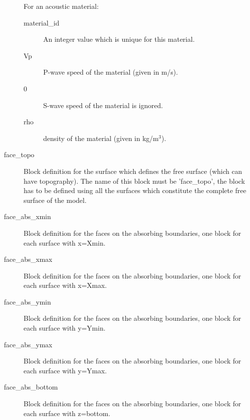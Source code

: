 \begin{description}
For an acoustic material:
\begin{description}
\item [{material\_id}] An integer value which is unique for this material.
\item [{Vp}] P-wave speed of the material (given in m/s).
\item [{0}] S-wave speed of the material is ignored.
\item [{rho}] density of the material (given in kg/m$^{3}$).
\end{description}
\item [{face\_topo}] Block definition for the surface which defines the
free surface (which can have topography). The name of this block must
be 'face\_topo', the block has to be defined using all the surfaces
which constitute the complete free surface of the model.
\item [{face\_abs\_xmin}] Block definition for the faces on the absorbing
boundaries, one block for each surface with x=Xmin.
\item [{face\_abs\_xmax}] Block definition for the faces on the absorbing
boundaries, one block for each surface with x=Xmax.
\item [{face\_abs\_ymin}] Block definition for the faces on the absorbing
boundaries, one block for each surface with y=Ymin.
\item [{face\_abs\_ymax}] Block definition for the faces on the absorbing
boundaries, one block for each surface with y=Ymax.
\item [{face\_abs\_bottom}] Block definition for the faces on the absorbing
boundaries, one block for each surface with z=bottom.
\end{description}
